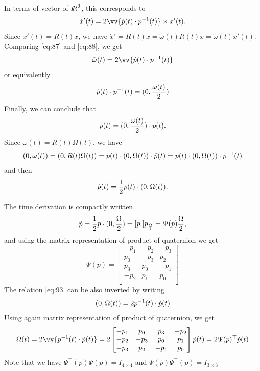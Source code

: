 In terms of vector of $\mbox{\rm $I\!\!R$}^3$, this corresponds to
\begin{equation}
  \label{eq:88}
  \dot x'(t) = 2 \vv{ \dot p(t) \glaw p^{-1}(t) } \times x'(t).
\end{equation}
Since $x'(t) = R(t) x$, we have $\dot x' = \dot R(t) x = \tilde \omega(t) R(t) x  = \tilde \omega(t) x'(t) $. Comparing \eqref{eq:87} and \eqref{eq:88}, we get
\begin{equation}
  \label{eq:89}
  \tilde \omega(t)  = 2 \vv{ \dot p(t) \glaw p^{-1}(t) }
\end{equation}
or equivalently
\begin{equation}
  \dot p(t) \cdot p^{-1}(t) = (0, \frac{\omega(t)}{2} )
  \label{eq:90}
\end{equation}
Finally, we can conclude that
\begin{equation}
  \label{eq:91}
  \dot p(t) = (0, \frac{\omega(t)}2 ) \cdot p(t).
\end{equation}
Since $\omega(t)=R(t)\Omega(t)$, we have
\begin{equation}
  \label{eq:92}
  (0, \omega(t) ) = (0, R(t) \Omega(t) ) = p(t) \cdot (0, \Omega(t) ) \cdot \bar p(t) = p(t) \cdot (0, \Omega(t) ) \cdot  p^{-1}(t)
\end{equation}
and then
\begin{equation}
  \label{eq:93}
  \dot p(t) =\frac 1 2 p(t) \cdot(0, \Omega(t) ) .
\end{equation}

The time derivation is compactly written
\begin{equation}
  \label{eq:94}
  \dot p = \frac  1 2 p  \cdot(0, \frac\Omega 2 ) =  [p_\cdot] p_{\frac \Omega 2} = \Psi(p)\frac \Omega 2,
\end{equation}
and using the matrix representation of product of  quaternion
we get
\begin{equation}
  \label{eq:95}
  \Psi(p) =  \begin{bmatrix}
    -p_1 & -p_2 & -p_3 \\
    p_0 & -p_3 & p_2 \\
    p_3 & p_0 & -p_1 \\
    -p_2 & p_1 & p_0 \\
  \end{bmatrix}
\end{equation}
The relation \eqref{eq:93} can be also inverted by writing
\begin{equation}
  \label{eq:96}
   (0, \Omega(t) ) = 2 p^{-1}(t) \cdot \dot p(t)
\end{equation}
Using again  matrix representation of product of  quaternion, we get
\begin{equation}
  \label{eq:97}
  \Omega(t)  = 2 \vv{p^{-1}(t) \glaw \dot p(t)}  = 2  \begin{bmatrix}
    -p_1 & p_0 & p_3 & -p_2 \\
    -p_2 & -p_3 & p_0 & p_1 \\
    -p_3 & p_2 & -p_1  & p_0\\
  \end{bmatrix}\dot p(t) = 2 \Psi(p)^\top \dot p(t)
\end{equation}
Note that we have $\Psi^\top(p)\Psi(p)= I_{4\times 4 }$ and  $\Psi(p)\Psi^\top(p)= I_{3\times 3 }$

